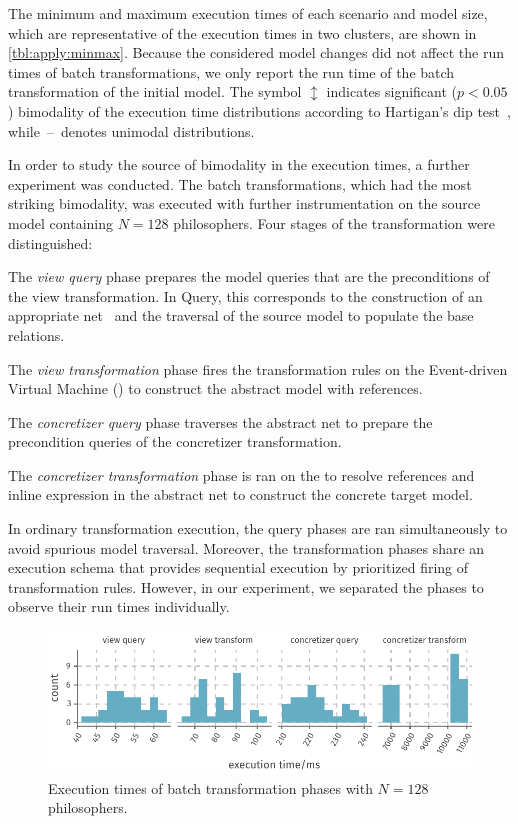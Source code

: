 The minimum and maximum execution times of each scenario and model size, which are representative of the execution times in two clusters, are shown in \cref{tbl:apply:minmax}. Because the considered model changes did not affect the run times of batch transformations, we only report the run time of the batch transformation of the initial model. The symbol \(\updownarrow\) indicates significant (\(p < 0.05\)) bimodality of the execution time distributions according to Hartigan's dip test~\citep{Maechler16diptest}, while~--~denotes unimodal distributions.

In order to study the source of bimodality in the execution times, a further experiment was conducted. The batch transformations, which had the most striking bimodality, was executed with further instrumentation on the source model containing \(N = 128\) philosophers. Four stages of the transformation were distinguished:
\begin{enumerate*}
\item The \emph{view query} phase prepares the model queries that are the preconditions of the view transformation. In  Query, this corresponds to the construction of an appropriate  net~ and the traversal of the source model to populate the base relations.
\item The \emph{view transformation} phase fires the transformation rules on the  Event-driven Virtual Machine () to construct the abstract  model with references.
\item The \emph{concretizer query} phase traverses the abstract net to prepare the precondition queries of the concretizer transformation.
\item The \emph{concretizer transformation} phase is ran on the  to resolve references and inline expression in the abstract net to construct the concrete  target model.
\end{enumerate*}
In ordinary transformation execution, the query phases are ran simultaneously to avoid spurious model traversal. Moreover, the transformation phases share an  execution schema that provides sequential execution by prioritized firing of transformation rules. However, in our experiment, we separated the phases to observe their run times individually.

\begin{figure}
  \centering
  \includegraphics{figures/plot_histogram}
  \caption{Execution times of batch transformation phases with \(N = 128\) philosophers.}
  \label{fig:apply:histogram}
\end{figure}

